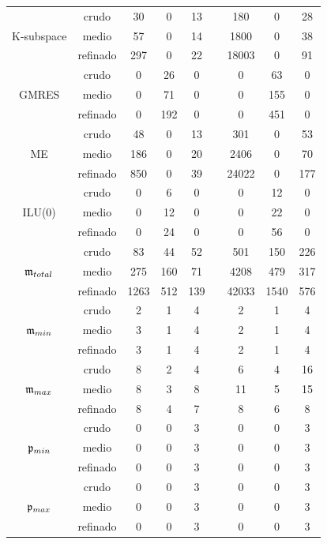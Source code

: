 \begin{table}[htb]
\begin{adjustbox}{width=0.8\columnwidth,center}
\begin{tabular}{  ccccccccc }
		\hline
		& crudo & 30 & 0 & 13 &  & 180 & 0 & 28 \\
		K-subspace  & medio & 57 & 0 & 14 &  & 1800 & 0 & 38 \\
		& refinado & 297 & 0 & 22  & & 18003 & 0 & 91 \\
		\hline
		& crudo & 0 & 26 & 0  & & 0 & 63 & 0 \\
		GMRES  & medio & 0 & 71 & 0 & & 0 & 155 & 0 \\
		& refinado & 0 & 192 & 0 & & 0 & 451 & 0 \\
		\hline
		& crudo & 48 & 0 & 13 & &  301 & 0 & 53 \\
		ME  & medio & 186 & 0 & 20  & & 2406 & 0 & 70 \\
		& refinado & 850 & 0 & 39  & & 24022 & 0 & 177 \\
		\hline
		& crudo & 0 & 6 & 0 & &  0 & 12 & 0 \\
		ILU(0)  & medio & 0 & 12 & 0  & & 0 & 22 & 0 \\
		& refinado & 0 & 24 & 0 &  & 0 & 56 & 0 \\
		\hline
		& crudo & 83 & 44 & 52  & & 501 & 150 & 226 \\
		$\mathfrak{m}_{total}$  & medio & 275 & 160 & 71  & & 4208 & 479 & 317 \\
		& refinado & 1263 & 512 & 139 &  & 42033 & 1540 & 576 \\
		\hline
		& crudo & 2 & 1 & 4  & & 2 & 1 & 4 \\
		$\mathfrak{m}_{min}$  & medio & 3 & 1 & 4  & & 2 & 1 & 4 \\
		& refinado & 3 & 1 & 4  & & 2 & 1 & 4 \\
		\hline
		& crudo & 8 & 2 & 4  & & 6 & 4 & 16 \\
		$\mathfrak{m}_{max}$  & medio & 8 & 3 & 8  & & 11 & 5 & 15 \\
		& refinado & 8 & 4 & 7  & & 8 & 6 & 8 \\
		\hline
		& crudo & 0 & 0 & 3  & & 0 & 0 & 3 \\
		$\mathfrak{p}_{min}$  & medio & 0 & 0 & 3 &  & 0 & 0 & 3 \\
		& refinado & 0 & 0 & 3  & & 0 & 0 & 3 \\
		\hline
		& crudo & 0 & 0 & 3  & & 0 & 0 & 3 \\
		$\mathfrak{p}_{max}$  & medio & 0 & 0 & 3 &  & 0 & 0 & 3  \\
		& refinado & 0 & 0 & 3  & & 0 & 0 & 3 \\
		\hline
	\end{tabular}
\end{adjustbox}
\end{table}




